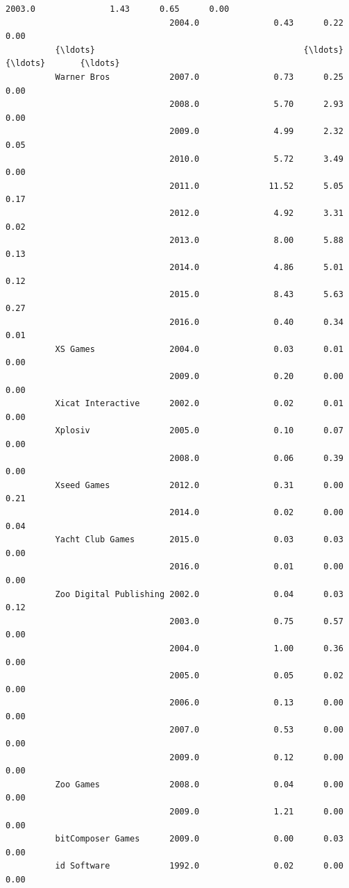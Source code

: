 \documentclass[11pt]{article}
\begin{document}
\begin{Verbatim}[commandchars=\\\{\}]
                                 2003.0               1.43      0.65      0.00   
                                 2004.0               0.43      0.22      0.00   
          {\ldots}                                          {\ldots}       {\ldots}       {\ldots}   
          Warner Bros            2007.0               0.73      0.25      0.00   
                                 2008.0               5.70      2.93      0.00   
                                 2009.0               4.99      2.32      0.05   
                                 2010.0               5.72      3.49      0.00   
                                 2011.0              11.52      5.05      0.17   
                                 2012.0               4.92      3.31      0.02   
                                 2013.0               8.00      5.88      0.13   
                                 2014.0               4.86      5.01      0.12   
                                 2015.0               8.43      5.63      0.27   
                                 2016.0               0.40      0.34      0.01   
          XS Games               2004.0               0.03      0.01      0.00   
                                 2009.0               0.20      0.00      0.00   
          Xicat Interactive      2002.0               0.02      0.01      0.00   
          Xplosiv                2005.0               0.10      0.07      0.00   
                                 2008.0               0.06      0.39      0.00   
          Xseed Games            2012.0               0.31      0.00      0.21   
                                 2014.0               0.02      0.00      0.04   
          Yacht Club Games       2015.0               0.03      0.03      0.00   
                                 2016.0               0.01      0.00      0.00   
          Zoo Digital Publishing 2002.0               0.04      0.03      0.12   
                                 2003.0               0.75      0.57      0.00   
                                 2004.0               1.00      0.36      0.00   
                                 2005.0               0.05      0.02      0.00   
                                 2006.0               0.13      0.00      0.00   
                                 2007.0               0.53      0.00      0.00   
                                 2009.0               0.12      0.00      0.00   
          Zoo Games              2008.0               0.04      0.00      0.00   
                                 2009.0               1.21      0.00      0.00   
          bitComposer Games      2009.0               0.00      0.03      0.00   
          id Software            1992.0               0.02      0.00      0.00   
          

\end{Verbatim}
\end{document}
